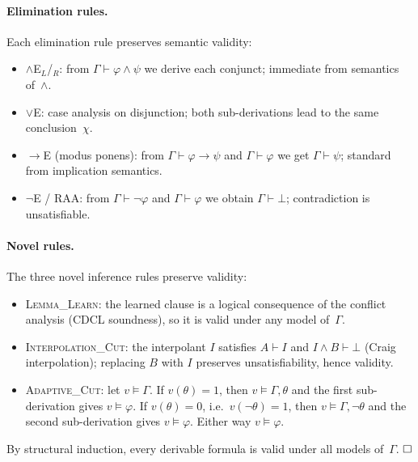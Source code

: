 \documentclass[conference]{IEEEtran}
\newcommand{\proves}{\vdash}
\begin{document}
\paragraph{Elimination rules.}
Each elimination rule preserves semantic validity:
\begin{itemize}
  \item $\wedge$E$_L$/$_R$: from $\Gamma \proves \varphi \wedge \psi$ we
    derive each conjunct; immediate from semantics of~$\wedge$.

  \item $\vee$E: case analysis on disjunction; both sub-derivations
    lead to the same conclusion~$\chi$.

  \item $\to$E (modus ponens): from $\Gamma \proves \varphi \to \psi$
    and $\Gamma \proves \varphi$ we get $\Gamma \proves \psi$;
    standard from implication semantics.

  \item $\neg$E / RAA: from $\Gamma \proves \neg\varphi$ and
    $\Gamma \proves \varphi$ we obtain $\Gamma \proves \bot$;
    contradiction is unsatisfiable.
\end{itemize}

\paragraph{Novel rules.}
The three novel inference rules preserve validity:
\begin{itemize}
  \item \textsc{Lemma\_Learn}: the learned clause is a logical consequence
    of the conflict analysis (CDCL soundness), so it is valid under
    any model of~$\Gamma$.

  \item \textsc{Interpolation\_Cut}: the interpolant $I$ satisfies
    $A \proves I$ and $I \wedge B \proves \bot$ (Craig interpolation);
    replacing $B$ with $I$ preserves unsatisfiability, hence validity.

  \item \textsc{Adaptive\_Cut}: let $v \models \Gamma$.  If $v(\theta)=1$,
    then $v \models \Gamma, \theta$ and the first sub-derivation gives
    $v \models \varphi$.  If $v(\theta)=0$, i.e.\ $v(\neg\theta)=1$,
    then $v \models \Gamma, \neg\theta$ and the second sub-derivation
    gives $v \models \varphi$.  Either way $v \models \varphi$.
\end{itemize}

By structural induction, every derivable formula is valid under all
models of~$\Gamma$.  $\hfill\square$
\end{document}
